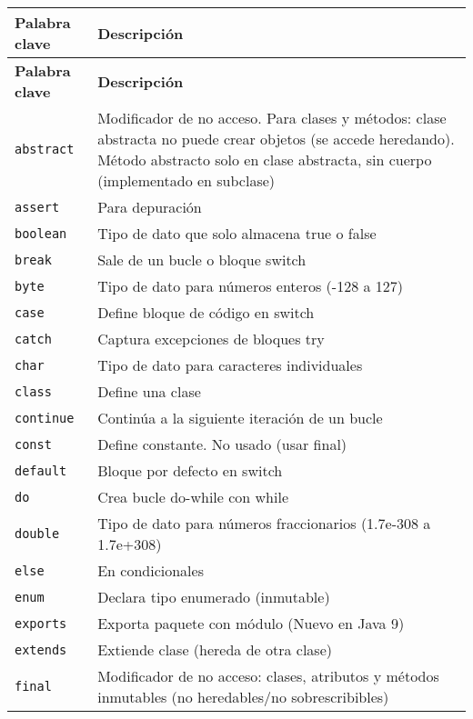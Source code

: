 \documentclass[12pt]{article}
\theoremstyle{largebreak}
\begin{document}
    \begin{longtable}{l p{}}
    \toprule
    \textbf{Palabra clave} & \textbf{Descripción} \\
    \midrule
    \endfirsthead

    \midrule
    \textbf{Palabra clave} & \textbf{Descripción} \\
    \midrule
    \endhead

    \bottomrule
    \endfoot

    \lstinline|abstract| & Modificador de no acceso. Para clases y métodos: clase abstracta no puede crear objetos (se accede heredando). Método abstracto solo en clase abstracta, sin cuerpo (implementado en subclase) \\
    \lstinline|assert| & Para depuración \\
    \lstinline|boolean| & Tipo de dato que solo almacena true o false \\
    \lstinline|break| & Sale de un bucle o bloque switch \\
    \lstinline|byte| & Tipo de dato para números enteros (-128 a 127) \\
    \lstinline|case| & Define bloque de código en switch \\
    \lstinline|catch| & Captura excepciones de bloques try \\
    \lstinline|char| & Tipo de dato para caracteres individuales \\
    \lstinline|class| & Define una clase \\
    \lstinline|continue| & Continúa a la siguiente iteración de un bucle \\
    \lstinline|const| & Define constante. No usado (usar final) \\
    \lstinline|default| & Bloque por defecto en switch \\
    \lstinline|do| & Crea bucle do-while con while \\
    \lstinline|double| & Tipo de dato para números fraccionarios (1.7e-308 a 1.7e+308) \\
    \lstinline|else| & En condicionales \\
    \lstinline|enum| & Declara tipo enumerado (inmutable) \\
    \lstinline|exports| & Exporta paquete con módulo (Nuevo en Java 9) \\
    \lstinline|extends| & Extiende clase (hereda de otra clase) \\
    \lstinline|final| & Modificador de no acceso: clases, atributos y métodos inmutables (no heredables/no sobrescribibles) \\

\end{longtable}
\end{document}

